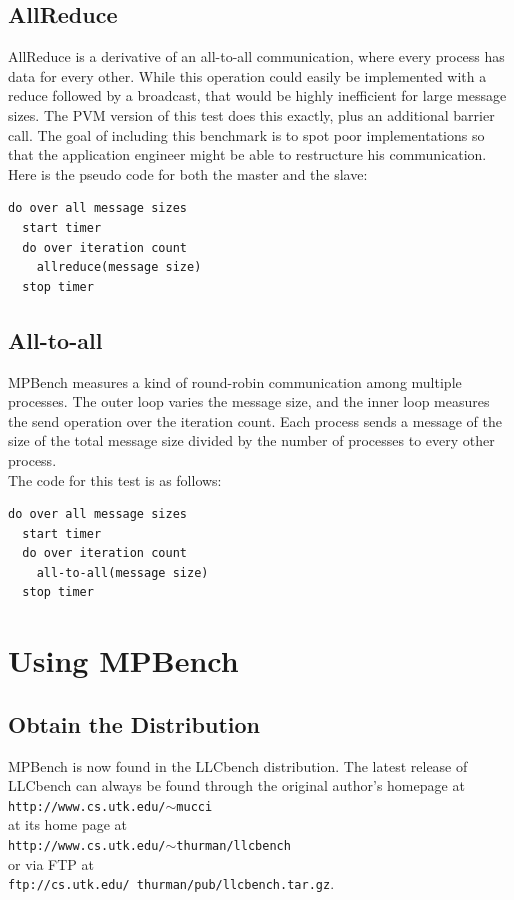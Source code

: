 \documentclass [12pt]{article}
\begin{document}
\subsection{AllReduce}

AllReduce is a derivative of an all-to-all communication, where every
process has data for every other. While this operation could easily be
implemented with a reduce followed by a broadcast, that would be highly
inefficient for large message sizes. The PVM version of this test
does this exactly, plus an additional barrier call.
The goal of including this benchmark
is to spot poor implementations so that the application engineer might
be able to restructure his communication. \\

Here is the pseudo code for both the master and the slave:
\begin{verbatim}
do over all message sizes
  start timer
  do over iteration count
    allreduce(message size)
  stop timer
\end{verbatim}

\subsection{All-to-all}

MPBench measures a kind of round-robin communication among multiple processes. The outer loop
varies the message size, and the inner loop measures the send operation over the iteration count. 
Each process sends a message of the size of the total message size divided by the number of processes to 
every other process.  \\

The code for this test is as follows:
\begin{verbatim}
do over all message sizes
  start timer
  do over iteration count
    all-to-all(message size)
  stop timer
\end{verbatim}

\section{Using MPBench}

\subsection{Obtain the Distribution}
MPBench is now found in the LLCbench distribution.
The latest release of LLCbench can always be found through the original author's homepage at \\
{\tt http://www.cs.utk.edu/$\sim$mucci} \\ at its home page at \\ 
{\tt http://www.cs.utk.edu/$\sim$thurman/llcbench} \\
or via FTP at \\ {\tt ftp://cs.utk.edu/~thurman/pub/llcbench.tar.gz}.\\
\end{document}
